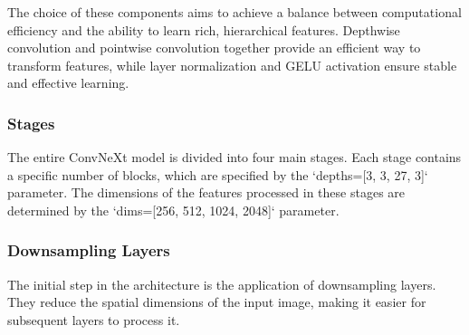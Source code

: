 \documentclass[a4paper,12pt,openright]{book}
\begin{document}
The choice of these components aims to achieve a balance between computational efficiency and the ability to learn rich, hierarchical features. Depthwise convolution and pointwise convolution together provide an efficient way to transform features, while layer normalization and GELU activation ensure stable and effective learning.


\subsubsection{Stages}
The entire ConvNeXt model is divided into four main stages. Each stage contains a specific number of blocks, which are specified by the `depths=[3, 3, 27, 3]` parameter. The dimensions of the features processed in these stages are determined by the `dims=[256, 512, 1024, 2048]` parameter.

\subsubsection{Downsampling Layers}
The initial step in the architecture is the application of downsampling layers. They reduce the spatial dimensions of the input image, making it easier for subsequent layers to process it.
\end{document}
